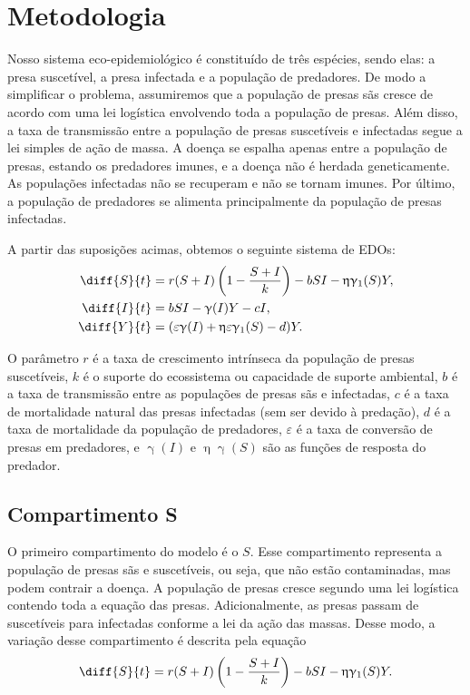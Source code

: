 \documentclass{article}
\begin{document}
\section{Metodologia}
Nosso sistema eco-epidemiológico é constituído de três espécies, sendo elas: a presa suscetível, a presa infectada e a população de predadores. De modo a simplificar o problema, assumiremos que a população de presas sãs cresce de acordo com uma lei logística envolvendo toda a população de presas. Além disso, a taxa de transmissão entre a população de presas suscetíveis e infectadas segue a lei simples de ação de massa. A doença se espalha apenas entre a população de presas, estando os predadores imunes, e a doença não é herdada geneticamente. As populações infectadas não se recuperam e não se tornam imunes. Por último, a população de predadores se alimenta principalmente da população de presas infectadas. 

A partir das suposições acimas, obtemos o seguinte sistema de EDOs:
\begin{equation*}
\begin{split}
    \diff{S}{t} & = r(S+I) \left( 1 - \dfrac{S+I}{k} \right) - bSI - \upeta \upgamma_1(S)Y, \\
    \diff{I}{t} & = bSI - \upgamma(I)Y - cI, \\
    \diff{Y}{t} & = (\varepsilon \upgamma(I) + \upeta \varepsilon \upgamma_1(S) - d)Y.
\end{split}
\end{equation*}

O parâmetro $r$ é a taxa de crescimento intrínseca da população de presas suscetíveis, $k$ é o suporte do ecossistema ou capacidade de suporte ambiental, $b$ é a taxa de transmissão entre as populações de presas sãs e infectadas, $c$ é a taxa de mortalidade natural das presas infectadas (sem ser devido à predação), $d$ é a taxa de mortalidade da população de predadores, $\varepsilon$ é a taxa de conversão de presas em predadores, e $\upgamma(I)$ e $\upeta \upgamma(S)$ são as funções de resposta do predador.

\subsection{Compartimento S}
O primeiro compartimento do modelo é o $S$. Esse compartimento representa a população de presas sãs e suscetíveis, ou seja, que não estão contaminadas, mas podem contrair a doença. A população de presas cresce segundo uma lei logística contendo toda a equação das presas. Adicionalmente, as presas passam de suscetíveis para infectadas conforme a lei da ação das massas. Desse modo, a variação desse compartimento é descrita pela equação
\begin{equation*}
    \diff{S}{t} = r(S+I) \left( 1 - \dfrac{S+I}{k} \right) - bSI - \upeta \upgamma_1(S)Y.
\end{equation*}
\end{document}

